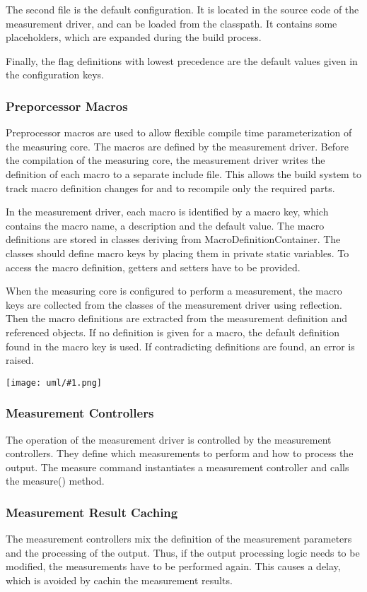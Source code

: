 \documentclass[a4paper,12pt]{article}
\newcommand{\umlDiagram}[1]{\begin{center}\texttt{[image: uml/\#1.png]}\end{center}}
\begin{document}
The second file is the default configuration. It is located in the source code of the measurement driver, and can be loaded from the classpath. It contains some placeholders, which are expanded during the build process.

Finally, the flag definitions with lowest precedence are the default values given in the configuration keys.

\subsubsection{Preporcessor Macros}
Preprocessor macros are used to allow flexible compile time parameterization of the measuring core. The macros are defined by the measurement driver. Before the compilation of the measuring core, the measurement driver writes the definition of each macro to a separate include file. This allows the build system to track macro definition changes for and to recompile only the required parts.

In the measurement driver, each macro is identified by a macro key, which contains the macro name, a description and the default value. The macro definitions are stored in classes deriving from MacroDefinitionContainer. The classes should define macro keys by placing them in private static variables. To access the macro definition, getters and setters have to be provided. 

When the measuring core is configured to perform a measurement, the macro keys are collected from the classes of the measurement driver using reflection. Then the macro definitions are extracted from the measurement definition and referenced objects. If no definition is given for a macro, the default definition found in the macro key is used. If contradicting definitions are found, an error is raised.

\umlDiagram{MacroDefinitions}

\subsubsection{Measurement Controllers}
The operation of the measurement driver is controlled by the measurement controllers. They define which measurements to perform and how to process the output. The measure command instantiates a measurement controller and calls the measure() method.

\subsubsection{Measurement Result Caching}
The measurement controllers mix the definition of the measurement parameters and the processing of the output. Thus, if the output processing logic needs to be modified, the measurements have to be performed again. This causes a delay, which is avoided by cachin the measurement results. 
\end{document}
